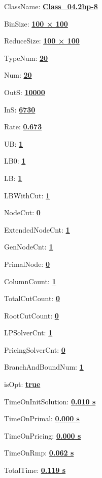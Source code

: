 \documentclass[11pt]{article}
\begin{document}
\pagestyle{empty}


ClassName: \underline{\textbf{Class_04.2bp-8}}
\par
BinSize: \underline{\textbf{100 × 100}}
\par
ReduceSize: \underline{\textbf{100 × 100}}
\par
TypeNum: \underline{\textbf{20}}
\par
Num: \underline{\textbf{20}}
\par
OutS: \underline{\textbf{10000}}
\par
InS: \underline{\textbf{6730}}
\par
Rate: \underline{\textbf{0.673}}
\par
UB: \underline{\textbf{1}}
\par
LB0: \underline{\textbf{1}}
\par
LB: \underline{\textbf{1}}
\par
LBWithCut: \underline{\textbf{1}}
\par
NodeCut: \underline{\textbf{0}}
\par
ExtendedNodeCnt: \underline{\textbf{1}}
\par
GenNodeCnt: \underline{\textbf{1}}
\par
PrimalNode: \underline{\textbf{0}}
\par
ColumnCount: \underline{\textbf{1}}
\par
TotalCutCount: \underline{\textbf{0}}
\par
RootCutCount: \underline{\textbf{0}}
\par
LPSolverCnt: \underline{\textbf{1}}
\par
PricingSolverCnt: \underline{\textbf{0}}
\par
BranchAndBoundNum: \underline{\textbf{1}}
\par
isOpt: \underline{\textbf{true}}
\par
TimeOnInitSolution: \underline{\textbf{0.010 s}}
\par
TimeOnPrimal: \underline{\textbf{0.000 s}}
\par
TimeOnPricing: \underline{\textbf{0.000 s}}
\par
TimeOnRmp: \underline{\textbf{0.062 s}}
\par
TotalTime: \underline{\textbf{0.119 s}}
\par
\newpage
\end{document}
